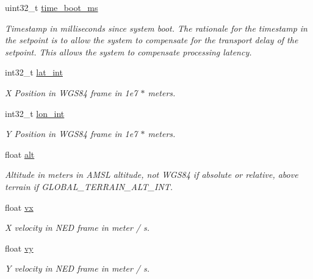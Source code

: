 \begin{DoxyCompactItemize}
\item 
uint32\+\_\+t \hyperlink{struct____mavlink__set__position__target__global__int__t_a06fb7be6c7bff5a263a0d795f5c8b8c1}{time\+\_\+boot\+\_\+ms}
\begin{DoxyCompactList}\small\item\em Timestamp in milliseconds since system boot. The rationale for the timestamp in the setpoint is to allow the system to compensate for the transport delay of the setpoint. This allows the system to compensate processing latency. \end{DoxyCompactList}\item 
int32\+\_\+t \hyperlink{struct____mavlink__set__position__target__global__int__t_a10e7ce290b2456dd2aac1fa5d0cbf6cf}{lat\+\_\+int}
\begin{DoxyCompactList}\small\item\em X Position in W\+G\+S84 frame in 1e7 $\ast$ meters. \end{DoxyCompactList}\item 
int32\+\_\+t \hyperlink{struct____mavlink__set__position__target__global__int__t_ada62154c5b6148813f6ebd7da5ce5600}{lon\+\_\+int}
\begin{DoxyCompactList}\small\item\em Y Position in W\+G\+S84 frame in 1e7 $\ast$ meters. \end{DoxyCompactList}\item 
float \hyperlink{struct____mavlink__set__position__target__global__int__t_a2c8327dfe3c7bb4ed2b1ed406538d153}{alt}
\begin{DoxyCompactList}\small\item\em Altitude in meters in A\+M\+S\+L altitude, not W\+G\+S84 if absolute or relative, above terrain if G\+L\+O\+B\+A\+L\+\_\+\+T\+E\+R\+R\+A\+I\+N\+\_\+\+A\+L\+T\+\_\+\+I\+N\+T. \end{DoxyCompactList}\item 
float \hyperlink{struct____mavlink__set__position__target__global__int__t_a658fe1b396302422121a30c84f09fab6}{vx}
\begin{DoxyCompactList}\small\item\em X velocity in N\+E\+D frame in meter / s. \end{DoxyCompactList}\item 
float \hyperlink{struct____mavlink__set__position__target__global__int__t_a0f115f5dcb4c10959be86c2447616157}{vy}
\begin{DoxyCompactList}\small\item\em Y velocity in N\+E\+D frame in meter / s. \end{DoxyCompactList}\item 

\end{DoxyCompactItemize}
